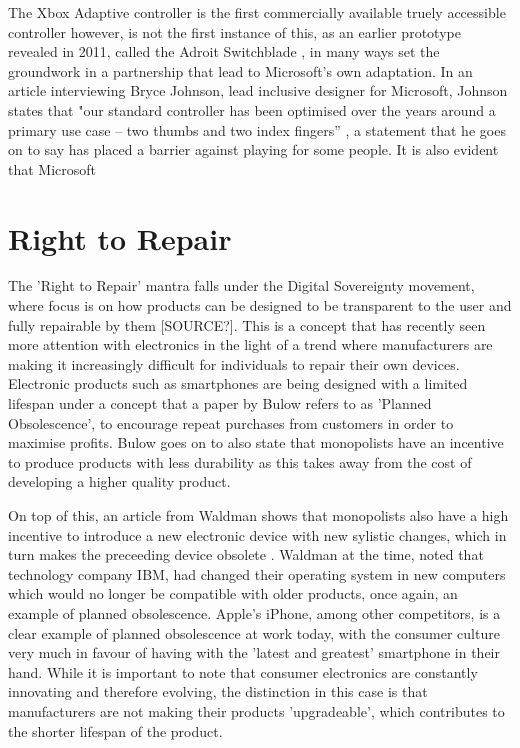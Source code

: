 The Xbox Adaptive controller is the first commercially available truely accessible controller however, is not the first instance of this, as an earlier prototype revealed in 2011, called the Adroit Switchblade \cite{ablegamer}, in many ways set the groundwork in a partnership that lead to Microsoft's own adaptation.
In an article interviewing Bryce Johnson, lead inclusive designer for Microsoft, Johnson states that "our standard controller has been optimised over the years around a primary use case – two thumbs and two index fingers” \cite{disabilitygaming}, a statement that he goes on to say has placed a barrier against playing for some people.
It is also evident that Microsoft %



\section{Right to Repair}

The 'Right to Repair' mantra falls under the Digital Sovereignty movement, where focus is on how products can be designed to be transparent to the user and fully repairable by them [SOURCE?].
This is a concept that has recently seen more attention with electronics in the light of a trend where manufacturers are making it increasingly difficult for individuals to repair their own devices.
Electronic products such as smartphones are being designed with a limited lifespan under a concept that a paper by Bulow \cite{obsolescence} refers to as 'Planned Obsolescence', to encourage repeat purchases from customers in order to maximise profits.
Bulow goes on to also state that monopolists have an incentive to produce products with less durability as this takes away from the cost of developing a higher quality product.

On top of this, an article from Waldman shows that monopolists also have a high incentive to introduce a new electronic device with new sylistic changes, which in turn makes the preceeding device obsolete \cite{obsolescence2}.
Waldman at the time, noted that technology company IBM, had changed their operating system in new computers which would no longer be compatible with older products, once again, an example of planned obsolescence.
Apple's iPhone, among other competitors, is a clear example of planned obsolescence at work today, with the consumer culture very much in favour of having with the 'latest and greatest' smartphone in their hand.
While it is important to note that consumer electronics are constantly innovating and therefore evolving, the distinction in this case is that manufacturers are not making their products 'upgradeable', which contributes to the shorter lifespan of the product.

